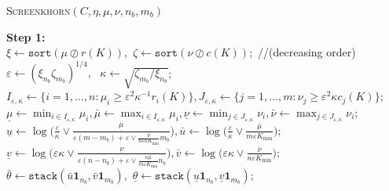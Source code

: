 \LinesNotNumbered
\begin{algorithm}[tbp]
\DontPrintSemicolon
\caption{\textsc{Screenkhorn}$(C,\eta,\mu,\nu,n_b,m_b)$}
\label{screenkhorn}

\textbf{Step 1:} \textcolor{black}{}\\

\nl   $\xi \gets \texttt{sort}(\mu \oslash r(K)),$ $\zeta \gets \texttt{sort}(\nu \oslash c(K));$ //(decreasing order)\\
\nl   $\varepsilon \gets (\xi_{n_b}\zeta_{m_b})^{1/4}, \text{  } \kappa \gets \sqrt{{\zeta_{m_b}}/{\xi_{n_b}}}$;\\
\nl   $I_{\varepsilon,\kappa} \gets \{i=1, \ldots, n: \mu_i \geq {\varepsilon^2} \kappa^{-1} r_i(K)\}, J_{\varepsilon,\kappa} \gets \{j=1, \ldots, m: \nu_j \geq \varepsilon^2\kappa c_j(K)\};$\\ 
\nl   $\underline{\mu} \gets \min_{i \in I_{\varepsilon,\kappa}} \mu_i, \bar{\mu} \gets \max_{i \in I_{\varepsilon,\kappa}} \mu_i, \underline{\nu} \gets \min_{j \in J_{\varepsilon,\kappa}} \nu_i, \bar{\nu} \gets \max_{j \in J_{\varepsilon,\kappa}} \nu_i$; \\
\nl   $\underline{u} \gets \log\big(\frac \varepsilon\kappa \vee \frac{\underline{\mu}}{\varepsilon (m-m_b) + \varepsilon \vee \frac{\bar{\nu}}{n\varepsilon\kappa K_{\min}} m_b}\big), \bar{u} \gets  \log\big(\frac \varepsilon\kappa\vee \frac{\bar{\mu}}{m\varepsilon K_{\min}}\big);$\\
\nl   $\underline{v} \gets \log\big(\varepsilon\kappa \vee \frac{\underline{\nu}}{\varepsilon(n-n_b) + \varepsilon \vee \frac{\kappa\bar{\mu}}{m\varepsilon K_{\min}} n_b}\big), \bar{v} \gets \log\big(\varepsilon\kappa \vee \frac{\bar{\nu}}{n\varepsilon K_{\min}}\big);$\\
\nl   $ \bar{\theta} \gets \texttt{stack}(\bar{u}\mathbf 1_{n_b}, \bar{v}\mathbf 1_{m_b}),$ $ \underline{\theta} \gets \texttt{stack}(\underline{u}\mathbf 1_{n_b}, \underline{v}\mathbf 1_{m_b}) ;$\\


\end{algorithm}
